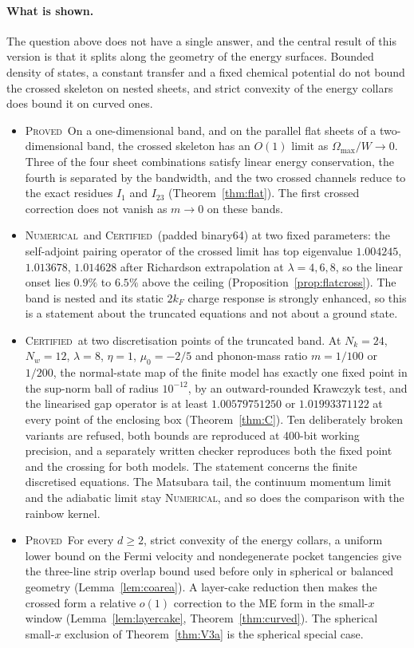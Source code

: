 \documentclass[11pt]{article}
\newcommand{\PROVED}{\upshape\mdseries\textsc{Proved}}
\newcommand{\CERT}{\upshape\mdseries\textsc{Certified}}
\newcommand{\NUM}{\upshape\mdseries\textsc{Numerical}}
\theoremstyle{definition}
\theoremstyle{remark}
\begin{document}
\paragraph{What is shown.}
The question above does not have a single answer, and the central result of this version is that it splits along the geometry of the energy surfaces. Bounded density of states, a constant transfer and a fixed chemical potential do not bound the crossed skeleton on nested sheets, and strict convexity of the energy collars does bound it on curved ones.
\begin{itemize}
\item \PROVED\ On a one-dimensional band, and on the parallel flat sheets of a two-dimensional band, the crossed skeleton has an $O(1)$ limit as $\Omega_{\max}/W\to0$. Three of the four sheet combinations satisfy linear energy conservation, the fourth is separated by the bandwidth, and the two crossed channels reduce to the exact residues $I_1$ and $I_{23}$ (Theorem~\ref{thm:flat}). The first crossed correction does not vanish as $m\to0$ on these bands.
\item \NUM\ and \CERT\ (padded binary64) at two fixed parameters: the self-adjoint pairing operator of the crossed limit has top eigenvalue $1.004245$, $1.013678$, $1.014628$ after Richardson extrapolation at $\lambda=4,6,8$, so the linear onset lies $0.9\%$ to $6.5\%$ above the ceiling (Proposition~\ref{prop:flatcross}). The band is nested and its static $2k_F$ charge response is strongly enhanced, so this is a statement about the truncated equations and not about a ground state.
\item \CERT\ at two discretisation points of the truncated band. At $N_k=24$, $N_w=12$, $\lambda=8$, $\eta=1$, $\mu_0=-2/5$ and phonon-mass ratio $m=1/100$ or $1/200$, the normal-state map of the finite model has exactly one fixed point in the sup-norm ball of radius $10^{-12}$, by an outward-rounded Krawczyk test, and the linearised gap operator is at least $1.00579751250$ or $1.01993371122$ at every point of the enclosing box (Theorem~\ref{thm:C}). Ten deliberately broken variants are refused, both bounds are reproduced at 400-bit working precision, and a separately written checker reproduces both the fixed point and the crossing for both models. The statement concerns the finite discretised equations. The Matsubara tail, the continuum momentum limit and the adiabatic limit stay \NUM, and so does the comparison with the rainbow kernel.
\item \PROVED\ For every $d\ge2$, strict convexity of the energy collars, a uniform lower bound on the Fermi velocity and nondegenerate pocket tangencies give the three-line strip overlap bound used before only in spherical or balanced geometry (Lemma~\ref{lem:coarea}). A layer-cake reduction then makes the crossed form a relative $o(1)$ correction to the ME form in the small-$x$ window (Lemma~\ref{lem:layercake}, Theorem~\ref{thm:curved}). The spherical small-$x$ exclusion of Theorem~\ref{thm:V3a} is the spherical special case.

\end{itemize}
\end{document}
